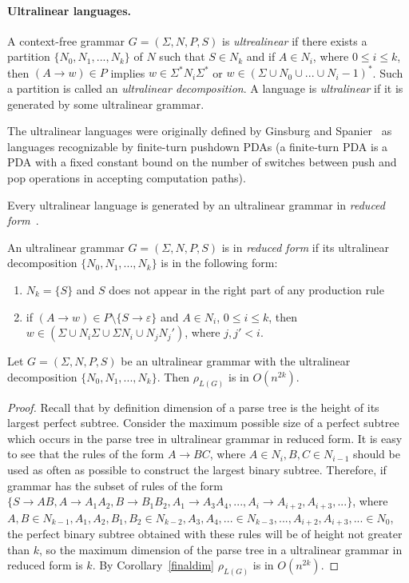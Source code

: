 \paragraph{Ultralinear languages.} A context-free grammar $G = (\Sigma, N, P, S)$ is \textit{ultrealinear} if there exists a partition $\{N_0, N_1, ..., N_k\}$ of $N$ such that $S \in N_k$ and if $A \in N_i$, where $0 \le i \le k$, then $(A \rightarrow w) \in P$ implies $w \in \Sigma^*N_i\Sigma^*$ or $w \in {(\Sigma \cup N_0 \cup ... \cup N_i-1)}^*$. Such a partition is called an \textit{ultralinear decomposition}. A language is \textit{ultralinear} if it is generated by some ultralinear grammar. 


The ultralinear languages were originally defined by Ginsburg and Spanier~\cite{Ginsburg1966FiniteTurnPA} as languages recognizable by finite-turn pushdown PDAs (a finite-turn PDA is a PDA with a fixed constant bound on the number of switches between push and pop operations in accepting computation paths). 

Every ultralinear language is generated by an ultralinear grammar in \textit{reduced form}~\cite{WORKMAN1976188}.
\begin{definition}
An ultralinear grammar $G = (\Sigma, N, P, S)$ is in \textit{reduced form} if its ultralinear decomposition $\{N_0, N_1, ..., N_k\}$ is in the following form:
\begin{enumerate}
\item $N_k=\{S\}$ and $S$ does not appear in the right part of any production rule
\item if $(A \rightarrow w) \in P \setminus \{S \rightarrow \varepsilon\}$ and $A \in N_i$, $0 \le i \le k$, then $w \in (\Sigma \cup N_i\Sigma \cup \Sigma N_i \cup N_jN_j')$, where $j, j' < i$.
\end{enumerate}
\end{definition}
\begin {theorem}
Let $G = (\Sigma, N, P, S)$ be an ultralinear grammar with the ultralinear decomposition $\{N_0, N_1, ..., N_k\}$. Then $\rho_{L(G)}$ is in $O(n^{2k})$.
\end{theorem}
\begin{proof}
Recall that by definition dimension of a parse tree is the height of its largest perfect subtree. Consider the maximum possible size of a perfect subtree which occurs in the parse tree in ultralinear grammar in reduced form. It is easy to see that the rules of the form $A \rightarrow BC$, where $A \in N_i, B, C \in N_{i-1}$ should be used as often as possible to construct the largest binary subtree. Therefore, if grammar has the subset of rules of the form $\{S \rightarrow AB, A \rightarrow A_1A_2, B \rightarrow B_1B_2, A_1\rightarrow A_3A_4, ..., A_i \rightarrow A_{i+2}, A_{i+3}, ...\}$, where $A, B \in N_{k-1}, A_1, A_2, B_1, B_2 \in N_{k-2}, A_3, A_4, ... \in N_{k-3}, ... , A_{i+2}, A_{i+3}, ... \in N_0$, the perfect binary subtree obtained with these rules will be of height not greater than $k$, so the maximum dimension of the parse tree in a ultralinear grammar in reduced form is $k$. By Corollary~\ref{finaldim}  $\rho_{L(G)}$ is in $O(n^{2k})$.
\end{proof}